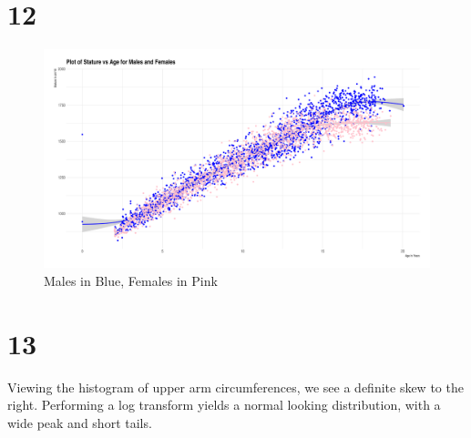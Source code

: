 \documentclass[a4paper]{article}
\begin{document}
\section*{12}
\begin{figure}[htpb]
	\centering
	\includegraphics[width=\textwidth]{q12.png}
	\caption{Males in Blue, Females in Pink}
\end{figure}

\section*{13}%
\label{sec:13}
Viewing the histogram of upper arm circumferences, we see a definite skew to the right. Performing a log transform yields a normal looking distribution, with a wide peak and short tails.
\end{document}
